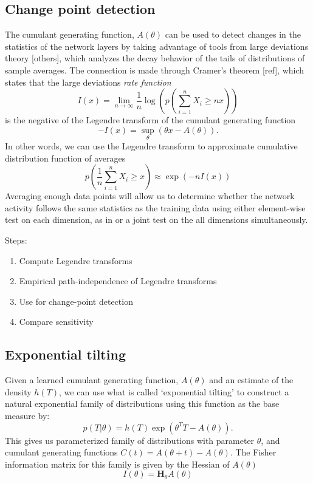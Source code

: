 \documentclass[10pt]{article}      %
\begin{document}
\subsection{Change point detection}
The cumulant generating function, $A(\theta)$ can be used to detect changes in the statistics of the network layers by taking advantage of tools from large deviations theory \cite{touchette_basic_2012} [others], which analyzes the decay behavior of the tails of distributions of sample averages.
The connection is made through Cramer's theorem [ref], which states that the large deviations \textit{rate function}
\begin{equation}
  I(x) = \lim_{n \to \infty} \frac{1}{n} \log \left( p \left( \sum_{i=1}^n X_i \ge n x \right) \right)
\end{equation}
is the negative of the Legendre transform of the cumulant generating function
\begin{equation}
  -I(x) = \sup_{\theta}( \theta x - A(\theta) ).
\end{equation}
In other words, we can use the Legendre transform to approximate cumulative distribution function of averages
\begin{equation}
  p \left( \frac{1}{n} \sum_{i=1}^n X_i \ge x \right) \approx \exp(-n I(x))
\end{equation}
Averaging enough data points will allow us to determine whether the network activity follows the same statistics as the training data using either element-wise test on each dimension, as in \cite{rabanser_failing_2019} or a joint test on the all dimensions simultaneously.


Steps:
\begin{enumerate}
  \item Compute Legendre transforms
  \item Empirical path-independence of Legendre transforms
  \item Use for change-point detection
  \item Compare sensitivity
\end{enumerate}



\subsection{Exponential tilting}
Given a learned cumulant generating function, $A(\theta)$ and an estimate of the density $h(T)$, we can use what is called `exponential tilting' \cite{morris_natural_1982,morris_unifying_2009} to construct a natural exponential family of distributions using this function as the base measure by:
\begin{equation}
  p(T | \theta) = h(T) \exp( \theta^T T - A(\theta)).
\end{equation}
This gives us parameterized family of distributions with parameter $\theta$, and cumulant generating functions $C(t) = A(\theta +t) - A(\theta)$.
The Fisher information matrix for this family is given by the Hessian of $A(\theta)$ 
\begin{equation}
  I(\theta) = \bm{H}_\theta A(\theta) 
\end{equation}
\end{document}
